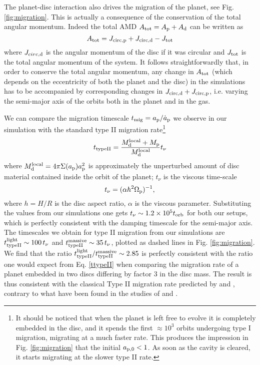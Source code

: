 \documentclass[usenatbib,a4paper,times,fleqn]{mnras}
\begin{document}
The planet-disc interaction also drives the migration of the planet, see Fig. \ref{fig:migration}.
This is actually a consequence of the conservation of the total angular momentum.
Indeed the total AMD $A_{\rm tot}=A_{\rm p}+A_{\rm d}$ can be written as
\begin{equation}
A_{\rm tot}=J_{\rm circ,p}+J_{\rm circ,d}-J_{\rm tot}\label{Atotmigr}
\end{equation}
where $J_{circ,\rm d}$ is the angular momentum of the disc if it was circular and $J_{\rm tot}$ is the total angular momentum of the system.
It follows straightforwardly that, in order to conserve the total angular momentum, any change in $A_{\rm tot}$ (which depends on the eccentricity of both the planet and the disc) in the simulations has to be accompanied by corresponding changes in $J_{\rm circ,d}+J_{\rm circ,p}$, i.e. varying the semi-major axis of the orbits both in the planet and in the gas.

We can compare the migration timescale $t_{\rm mig}=a_{\rm p}/\dot a_{\rm p}$ we observe in our simulation with the standard type II migration rate\footnote{It should be noticed that when the planet is left free to evolve it is completely embedded in the disc, and it spends the first $\approx 10^3$ orbits undergoing type I migration, migrating at a much faster rate. This produces the impression in Fig. \ref{fig:migration} that the initial $a_{\rm p,0}<1$. As soon as the cavity is cleared, it starts migrating at the slower type II rate.} \citep{syer1995,ivanov1999}
\begin{equation}
t_{\rm type II}=\frac{M_{\rm d}^{\rm local}+M_{\rm p}}{M_{\rm d}^{\rm local}}t_\nu\label{ttypeII}
\end{equation}
where $M_{\rm d}^{\rm local}=4\pi\Sigma(a_{\rm p})a_{\rm p}^2$ is approximately the unperturbed amount of disc material contained inside the orbit of the planet; $t_\nu$ is the viscous time-scale
\begin{equation}
t_\nu=(\alpha h^2\Omega_{\rm p})^{-1},
\end{equation}
where $h=H/R$ is the disc aspect ratio, $\alpha$ is the \citet{shakura1973} viscous parameter. Substituting the values from our simulations one gets $t_\nu\sim 1.2\times 10^5 t_{\rm orb}$ for both our setups, which is perfectly consistent with the damping timescale for the semi-major axis.
The timescales we obtain for type II migration from our simulations are $t_{\rm type II}^{\rm light}\sim 100\, t_\nu$ and $t_{\rm type II}^{\rm massive}\sim 35 \,t_\nu$, plotted as dashed lines in Fig. \ref{fig:migration}. We find that the ratio $t_{\rm type II}^{\rm light}/t_{\rm type II}^{\rm massive}\sim 2.85$ is perfectly consistent with the ratio one would expect from Eq. \ref{ttypeII} when comparing the migration rate of a planet embedded in two discs differing by factor 3 in the disc mass. The result is thus consistent with the classical Type II migration rate predicted by \citet{syer1995} and \citet{ivanov1999}, contrary to what have been found in the studies of \citet{durmann2015} and \citet{duffell2014}.
\end{document}
